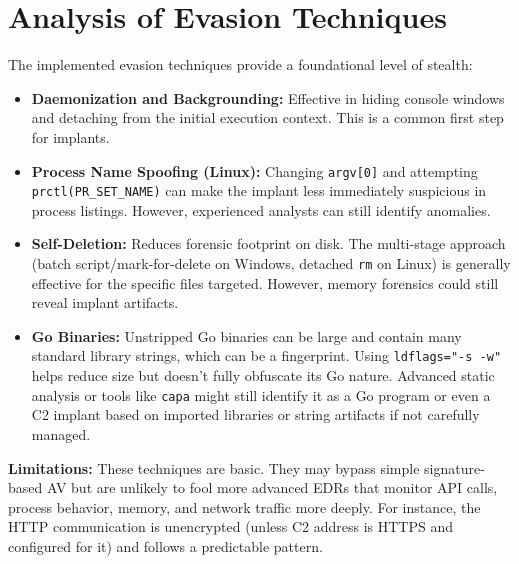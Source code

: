 \section{Analysis of Evasion Techniques}
The implemented evasion techniques provide a foundational level of stealth:
\begin{itemize}
    \item \textbf{Daemonization and Backgrounding:} Effective in hiding console windows and detaching from the initial execution context. This is a common first step for implants.
    \item \textbf{Process Name Spoofing (Linux):} Changing \texttt{argv[0]} and attempting \texttt{prctl(PR\_SET\_NAME)} can make the implant less immediately suspicious in process listings. However, experienced analysts can still identify anomalies.
    \item \textbf{Self-Deletion:} Reduces forensic footprint on disk. The multi-stage approach (batch script/mark-for-delete on Windows, detached \texttt{rm} on Linux) is generally effective for the specific files targeted. However, memory forensics could still reveal implant artifacts.
    \item \textbf{Go Binaries:} Unstripped Go binaries can be large and contain many standard library strings, which can be a fingerprint. Using \texttt{ldflags="-s -w"} helps reduce size but doesn't fully obfuscate its Go nature. Advanced static analysis or tools like \texttt{capa} might still identify it as a Go program or even a C2 implant based on imported libraries or string artifacts if not carefully managed.
\end{itemize}
\textbf{Limitations:} These techniques are basic. They may bypass simple signature-based AV but are unlikely to fool more advanced EDRs that monitor API calls, process behavior, memory, and network traffic more deeply. For instance, the HTTP communication is unencrypted (unless C2 address is HTTPS and configured for it) and follows a predictable pattern.

